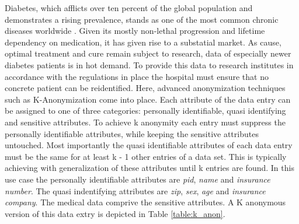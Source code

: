 Diabetes, which afflicts over ten percent of the global population and demonstrates a rising prevalence, stands as one of the most common chronic diseases worldwide \cite{idf2023,WHODiabetes2023}. Given its mostly non-lethal progression and lifetime dependency on medication, 
it has given rise to a substatial market. As cause, optimal treatment and cure remain subject to research, data of especially newer diabetes patients is in hot demand. To provide this data to research institutes in accordance with the regulations in place the hospital must ensure that no concrete patient can be reidentified. 
Here, advanced anonymization techniques such as K-Anonymization come into place. Each attribute of the data entry can be assigned to one of three categories: personally identifiable, quasi identifying and sensitive attributes. To achieve k anonymity each entry must suppress the personally identifiable attributes, while keeping the sensitive attributes untouched. 
Most importantly the quasi identifiable attributes of each data entry must be the same for at least k - 1 other entries of a data set. This is typically achieving with generalization of these attributes until k entries are found. In this use case the personally identifiable attributes are \textit{pid}, \textit{name} and \textit{insurance number}. 
The quasi indentifying attributes are \textit{zip}, \textit{sex}, \textit{age} and \textit{insurance company}. The medical data comprive the sensitive attributes. A K anonymous version of this data extry is depicted in Table \ref{table:k_anon}. 

\bigskip

